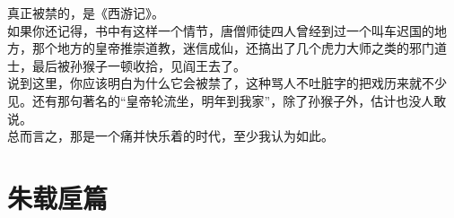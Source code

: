 \begin{multicols}{\theparacolNo}
真正被禁的，是《西游记》。\\

如果你还记得，书中有这样一个情节，唐僧师徒四人曾经到过一个叫车迟国的地方，那个地方的皇帝推崇道教，迷信成仙，还搞出了几个虎力大师之类的邪门道士，最后被孙猴子一顿收拾，见阎王去了。\\

说到这里，你应该明白为什么它会被禁了，这种骂人不吐脏字的把戏历来就不少见。还有那句著名的“皇帝轮流坐，明年到我家”，除了孙猴子外，估计也没人敢说。\\

总而言之，那是一个痛并快乐着的时代，至少我认为如此。\\
\ifnum{}
	\end{multicols}
\fi
\newpage

\chapter*{朱载垕篇}
